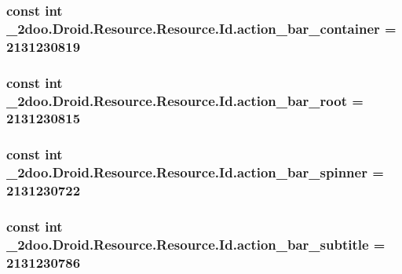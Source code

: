 \hypertarget{class__2doo_1_1_droid_1_1_resource_1_1_id_3f108297798543a4d80fe71e49b90d3a}{
\subsubsection[{action\_\-bar\_\-container}]{\setlength{\rightskip}{0pt plus 5cm}const int \_\-2doo.Droid.Resource.Resource.Id.action\_\-bar\_\-container = 2131230819}}
\label{class__2doo_1_1_droid_1_1_resource_1_1_id_3f108297798543a4d80fe71e49b90d3a}


\hypertarget{class__2doo_1_1_droid_1_1_resource_1_1_id_2ff5f736301c9fa85a499307977e4555}{
\subsubsection[{action\_\-bar\_\-root}]{\setlength{\rightskip}{0pt plus 5cm}const int \_\-2doo.Droid.Resource.Resource.Id.action\_\-bar\_\-root = 2131230815}}
\label{class__2doo_1_1_droid_1_1_resource_1_1_id_2ff5f736301c9fa85a499307977e4555}


\hypertarget{class__2doo_1_1_droid_1_1_resource_1_1_id_8b7987ba1e73d6fd4a3f1a03e3f329d6}{
\subsubsection[{action\_\-bar\_\-spinner}]{\setlength{\rightskip}{0pt plus 5cm}const int \_\-2doo.Droid.Resource.Resource.Id.action\_\-bar\_\-spinner = 2131230722}}
\label{class__2doo_1_1_droid_1_1_resource_1_1_id_8b7987ba1e73d6fd4a3f1a03e3f329d6}


\hypertarget{class__2doo_1_1_droid_1_1_resource_1_1_id_86708596af2b89f4aa1741b3427fab27}{
\subsubsection[{action\_\-bar\_\-subtitle}]{\setlength{\rightskip}{0pt plus 5cm}const int \_\-2doo.Droid.Resource.Resource.Id.action\_\-bar\_\-subtitle = 2131230786}}
\label{class__2doo_1_1_droid_1_1_resource_1_1_id_86708596af2b89f4aa1741b3427fab27}


